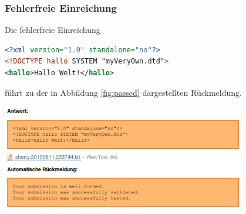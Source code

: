 \documentclass[a4paper]{scrartcl}
\begin{document}
  	  \subsubsection{Fehlerfreie Einreichung}
  	  Die fehlerfreie Einreichung
  	  \begin{lstlisting}[language=XML, captionpos=b, frame=tlRB, caption={Fehlerfreie Einreichung}]
<?xml version="1.0" standalone="no"?>
<!DOCTYPE hallo SYSTEM "myVeryOwn.dtd">
<hallo>Hallo Welt!</hallo>
\end{lstlisting}
  	  führt zu der in Abbildung \ref{fig:passed} dargestellten Rückmeldung.
  	  \begin{center}
	      \includegraphics[width=0.8\textwidth]{images/passed.png}
	      \label{fig:passed}
      \end{center}
\end{document}
